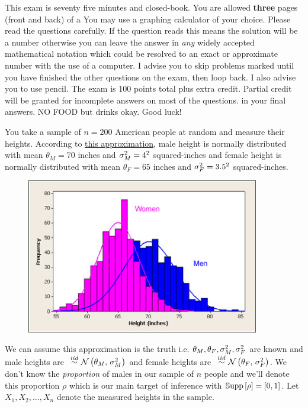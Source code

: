 \documentclass[12pt]{article}
\begin{document}
This exam is seventy five minutes and closed-book. You are allowed \textbf{three} pages (front and back) of a  You may use a graphing calculator of your choice. Please read the questions carefully. If the question reads  this means the solution will be a number otherwise you can leave the answer in \textit{any} widely accepted mathematical notation which could be resolved to an exact or approximate number with the use of a computer. I advise you to skip problems marked  until you have finished the other questions on the exam, then loop back. I also advise you to use pencil. The exam is 100 points total plus extra credit. Partial credit will be granted for incomplete answers on most of the questions.  in your final answers. NO FOOD but drinks okay. Good luck!

\pagebreak

\problem You take a sample of $n=200$ American people at random and measure their heights. According to \href{https://www.usablestats.com/lessons/normal}{this approximation}, male height is normally distributed with mean $\theta_M = 70$ inches and $\sigma^2_M = 4^2$ squared-inches and female height is normally distributed with mean $\theta_F = 65$ inches and $\sigma^2_F = 3.5^2$ squared-inches. 

\begin{figure}[h]
\centering
\includegraphics[width=4in]{men_women_height_histogram.jpg}
\end{figure}

\noindent We can assume this approximation is the truth i.e. $\theta_M, \theta_F, \sigma^2_M, \sigma^2_F$ are known and male heights are $\iid \normnot{\theta_M}{\sigsq_M}$ and female heights are $\iid \normnot{\theta_F}{\sigsq_F}$. We don't know the \emph{proportion} of males in our sample of $n$ people and we'll denote this proportion $\rho$ which is our main target of inference with $\mathbb{S}\text{upp}\left[\rho\right] = \left[0,1\right]$. Let $X_1, X_2, \ldots, X_n$ denote the measured heights in the sample.
\end{document}
